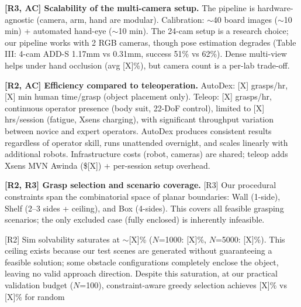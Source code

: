\documentclass[conference]{IEEEtran}
\newcommand{\rtwo}{{\color{R2}R2}}
\newcommand{\rthree}{{\color{R3}R3}}
\newcommand{\acmark}{{\color{AC}AC}}
\newcommand{\rssparagraph}[1]{{\bf #1.}}
\begin{document}
\rssparagraph{[\rthree, \acmark] Scalability of the multi-camera setup}
The pipeline is hardware-agnostic (camera, arm, hand are modular). Calibration: $\sim$40 board images ($\sim$10 min) + automated hand-eye ($\sim$10 min). The 24-cam setup is a research choice; our pipeline works with 2 RGB cameras, though pose estimation degrades (Table III: 4-cam ADD-S 1.17mm vs 0.31mm, success 51\% vs 62\%). Dense multi-view helps under hand occlusion (avg [X]\%), but camera count is a per-lab trade-off.

\rssparagraph{[\rtwo, \acmark] Efficiency compared to teleoperation}
AutoDex: [X] grasps/hr, [X] min human time/grasp (object placement only). Teleop: [X] grasps/hr, continuous operator presence (body suit, 22-DoF control), limited to [X] hrs/session (fatigue, Xsens charging), with significant throughput variation between novice and expert operators. AutoDex produces consistent results regardless of operator skill, runs unattended overnight, and scales linearly with additional robots. Infrastructure costs (robot, cameras) are shared; teleop adds Xsens MVN Awinda (\$[X]) + per-session setup overhead.

\rssparagraph{[\rtwo, \rthree] Grasp selection and scenario coverage}
[\rthree] Our procedural constraints span the combinatorial space of planar boundaries: Wall (1-side), Shelf (2--3 sides + ceiling), and Box (4-sides). This covers all feasible grasping scenarios; the only excluded case (fully enclosed) is inherently infeasible.

[\rtwo] Sim solvability saturates at $\sim$[X]\% ($N$=1000: [X]\%, $N$=5000: [X]\%). This ceiling exists because our test scenes are generated without guaranteeing a feasible solution; some obstacle configurations completely enclose the object, leaving no valid approach direction. Despite this saturation, at our practical validation budget ($N$=100), constraint-aware greedy selection achieves [X]\% vs [X]\% for random
\end{document}
